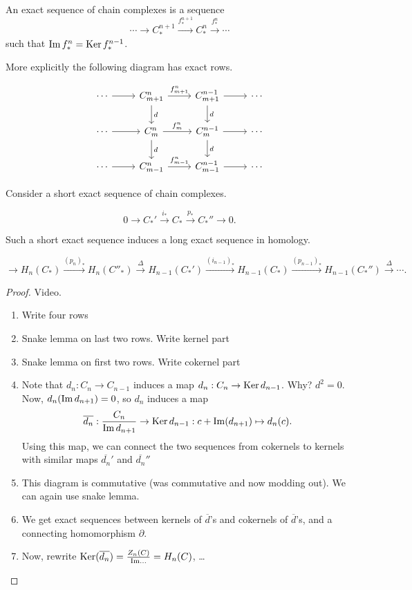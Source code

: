 \begin{definition}
    An exact sequence of chain complexes is a sequence
    \[
    \cdots \to  C_*^{n+1} \xrightarrow{f^{n+1}_*}  C_*^{n} \xrightarrow{f_*^{n}} \cdots
    \] 
    such that $\operatorname{Im} f_*^{n} = \operatorname{Ker} f_*^{n-1}$.
\end{definition}

More explicitly the following diagram has exact rows.

\[
    \begin{tikzcd}
       \cdots \arrow[r, ""] & \arrow[d, "d"]C_{m+1}^{n} \arrow[r, "f_{m+1}^{n}"] & \arrow[d, "d"]C_{m+1}^{n-1} \arrow[r, ""] & \cdots\\
        \cdots\arrow[r, ""] & \arrow[d, "d"]C_{m}^{n} \arrow[r, "f_{m}^{n}"] & \arrow[d, "d"]C_{m}^{n-1} \arrow[r, ""] & \cdots\\
        \cdots\arrow[r, ""] & C_{m-1}^{n} \arrow[r, "f_{m-1}^{n}"] & C_{m-1}^{n-1} \arrow[r, ""] & \cdots
    \end{tikzcd}
\]

Consider a short exact sequence of chain complexes.

\[
    0 \to  C_*'  \xrightarrow{i_*}  C_* \xrightarrow{p_*}   C_*'' \to  0
.\] 

Such a short exact sequence induces a long exact sequence in homology.

\[
    \to  H_n(C_*) \xrightarrow{(p_n)_*} H_n(C''_*) \xrightarrow{\Delta}  H_{n-1}(C_*') \xrightarrow{(i_{n-1})_*} H_{n-1}(C_*) \xrightarrow{(p_{n-1})_*}  H_{n-1}(C_*'') \xrightarrow{\Delta}  \cdots
.\] 

\begin{proof}
    Video.
    \begin{enumerate}[Step 1]
        \item Write four rows
        \item Snake lemma on last two rows. Write kernel part
        \item Snake lemma on first two rows. Write cokernel part
        \item Note that $d_n: C_n \to  C_{n-1}$ induces a map $d_{n}: C_n \to  \operatorname{Ker} d_{n-1}$.
            Why? $d^2 = 0$. 
            Now, $d_n(\operatorname{Im} d_{n+1}) = 0$, so $d_n$ induces a map 
             \[
                 \overline{d_n}: \frac{C_n}{\operatorname{Im} d_{n+1}} \to  \operatorname{Ker} d_{n-1}: c+ \operatorname{Im}(d_{n+1}) \mapsto  d_n(c)
            .\] 
            Using this map, we can connect the two sequences from cokernels to kernels with similar maps $\overline{d_n}'$ and $\overline{d_n}''$
        \item This diagram is commutative (was commutative and now modding out). We can again use snake lemma.
        \item We get exact sequences between kernels of $\overline{d}$'s and cokernels of $\overline{d}$'s, and a connecting homomorphism $\partial$.
        \item Now, rewrite  $\operatorname{Ker}(\overline{d_n}) = \frac{Z_n(C)}{\operatorname{Im} \ldots} = H_n(C)$, \ldots
    \end{enumerate}
\end{proof}

